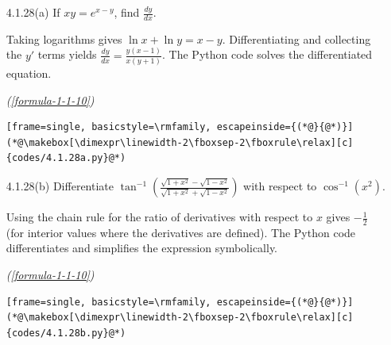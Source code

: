 \begin{enumerate}[label={},leftmargin=1.15cm,labelwidth=1.0cm,labelsep=0.15cm,itemindent=0pt,listparindent=0pt,itemsep=\baselineskip,parsep=0pt,topsep=0pt]
\vspace{0.6em}\par\solution


Direct matrix multiplication gives $A^2=\begin{bmatrix}11&14&0\\7&18&0\\0&0&25\end{bmatrix}$. Hence
\begin{equation*}
A^2-7A+10I=\boxed{\begin{bmatrix}0&0&0\\0&0&0\\0&0&0\end{bmatrix}}.
\tag*{(\ref{formula-1-1-1})}\end{equation*}
The Python code carries out the matrix operation.
\begin{lstlisting}[frame=single, basicstyle=\rmfamily, escapeinside={(*@}{@*)}]
(*@\makebox[\dimexpr\linewidth-2\fboxsep-2\fboxrule\relax][c]{codes/4.1.27.py}@*)
\end{lstlisting}

\item[4.1.28(a)] If $xy=e^{x-y}$, find $\frac{dy}{dx}$.

\vspace{0.6em}\par\solution


Taking logarithms gives $\ln x+\ln y=x-y$. Differentiating and collecting the $y'$ terms yields $\boxed{\frac{dy}{dx}=\frac{y(x-1)}{x(y+1)}}$. The Python code solves the differentiated equation.
\par\noindent\hfill\mbox{\textit{(\ref{formula-1-1-10})}}\par\begin{lstlisting}[frame=single, basicstyle=\rmfamily, escapeinside={(*@}{@*)}]
(*@\makebox[\dimexpr\linewidth-2\fboxsep-2\fboxrule\relax][c]{codes/4.1.28a.py}@*)
\end{lstlisting}

\item[4.1.28(b)] Differentiate $\tan^{-1}\!\left(\frac{\sqrt{1+x^2}-\sqrt{1-x^2}}{\sqrt{1+x^2}+\sqrt{1-x^2}}\right)$ with respect to $\cos^{-1}(x^2)$.

\vspace{0.6em}\par\solution


Using the chain rule for the ratio of derivatives with respect to $x$ gives $\boxed{-\frac12}$ (for interior values where the derivatives are defined). The Python code differentiates and simplifies the expression symbolically.
\par\noindent\hfill\mbox{\textit{(\ref{formula-1-1-10})}}\par\begin{lstlisting}[frame=single, basicstyle=\rmfamily, escapeinside={(*@}{@*)}]
(*@\makebox[\dimexpr\linewidth-2\fboxsep-2\fboxrule\relax][c]{codes/4.1.28b.py}@*)
\end{lstlisting}


\end{enumerate}
